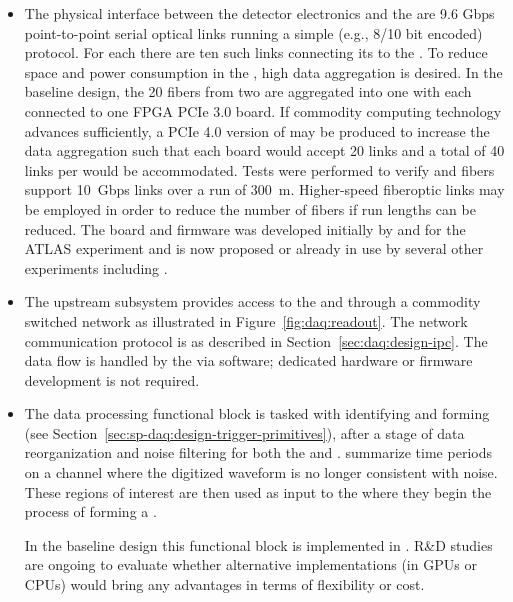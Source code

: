 \begin{itemize}
  
  \item The physical interface between the detector electronics and the  are 9.6 Gbps
point-to-point serial optical links running a simple (e.g., 8/10 bit encoded) protocol.  For each
 there are ten such links connecting its  to the . To reduce space and
power consumption in the , high data aggregation is desired. In the baseline design, the
20 fibers from two  are aggregated into one  with each  connected
to one  FPGA PCIe 3.0 board.  If commodity computing technology advances sufficiently, a PCIe 4.0 version of
 may be produced to increase the data aggregation such that each board would accept 20
links and a total of 40 links per  would be accommodated. Tests were performed to verify
 and  fibers support \SI{10}{Gbps} links over a run of \SI{300}{\meter}.
Higher-speed fiberoptic links may be employed in order to reduce the number of fibers if run
lengths can be reduced. The  board and firmware was developed initially by and for the
ATLAS experiment and is now proposed or already in use by several other experiments including
.
  
  \item The upstream  subsystem provides access to the
 and  through a commodity switched network as
illustrated in Figure~\ref{fig:daq:readout}. The network communication
protocol is as described in Section~\ref{sec:daq:design-ipc}. The data flow
is handled by the  via software; dedicated hardware or firmware
development is not required.

\item The data processing functional block is tasked with identifying and forming  (see
Section~\ref{sec:sp-daq:design-trigger-primitives}), after a stage of data
reorganization and noise filtering for both the  and .  summarize time periods on a channel where the digitized waveform is no longer consistent with noise.
These regions of interest are then used as input to the  where they begin the process of forming a .

In the baseline design this functional block is implemented in .
R\&D studies are ongoing to evaluate whether alternative implementations (in GPUs or CPUs) would bring any advantages in terms of flexibility or cost.


\end{itemize}
